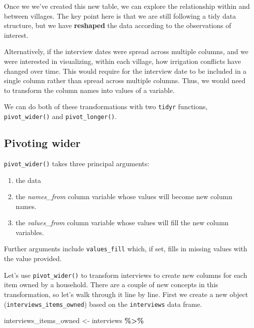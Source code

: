 \documentclass[
]{article}
\newenvironment{Shaded}{\begin{snugshade}}{\end{snugshade}}
\newcommand{\NormalTok}[1]{#1}
\newcommand{\OtherTok}[1]{\textcolor[rgb]{0.56,0.35,0.01}{#1}}
\newcommand{\SpecialCharTok}[1]{\textcolor[rgb]{0.81,0.36,0.00}{\textbf{#1}}}
\providecommand{\tightlist}{%
  \setlength{\itemsep}{0pt}\setlength{\parskip}{0pt}}
\begin{document}
Once we we've created this new table, we can explore the relationship
within and between villages. The key point here is that we are still
following a tidy data structure, but we have \textbf{reshaped} the data
according to the observations of interest.

Alternatively, if the interview dates were spread across multiple
columns, and we were interested in visualizing, within each village, how
irrigation conflicts have changed over time. This would require for the
interview date to be included in a single column rather than spread
across multiple columns. Thus, we would need to transform the column
names into values of a variable.

We can do both of these transformations with two \texttt{tidyr}
functions, \texttt{pivot\_wider()} and \texttt{pivot\_longer()}.

\subsection{Pivoting wider}\label{pivoting-wider}

\texttt{pivot\_wider()} takes three principal arguments:

\begin{enumerate}
\def\labelenumi{\arabic{enumi}.}
\tightlist
\item
  the data
\item
  the \emph{names\_from} column variable whose values will become new
  column names.
\item
  the \emph{values\_from} column variable whose values will fill the new
  column variables.
\end{enumerate}

Further arguments include \texttt{values\_fill} which, if set, fills in
missing values with the value provided.

Let's use \texttt{pivot\_wider()} to transform interviews to create new
columns for each item owned by a household. There are a couple of new
concepts in this transformation, so let's walk through it line by line.
First we create a new object (\texttt{interviews\_items\_owned}) based
on the \texttt{interviews} data frame.

\begin{Shaded}
\begin{Highlighting}[]
\NormalTok{interviews\_items\_owned }\OtherTok{\textless{}{-}}\NormalTok{ interviews }\SpecialCharTok{\%\textgreater{}\%}
\end{Highlighting}
\end{Shaded}
\end{document}

